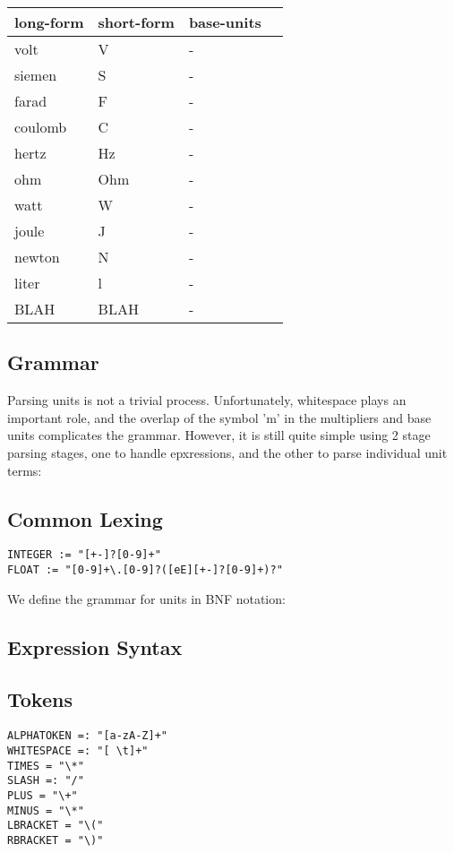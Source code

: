 \documentclass{article}
\begin{document}
\begin{center}
    \begin{tabular}{ | l | l |  l | p{5cm} |}
    \hline
    long-form & short-form & base-units  \\ \hline
    volt & V & - \\ \hline
    siemen & S & - \\ \hline
    farad & F & - \\ \hline
    coulomb & C & - \\ \hline
    hertz & Hz & - \\ \hline
    ohm & Ohm & - \\ \hline
    watt & W & - \\ \hline
    joule & J & - \\ \hline
    newton & N & - \\ \hline
    liter & l & - \\ \hline
    BLAH & BLAH & - \\ \hline
    \end{tabular}
\end{center}


\newpage
\subsection*{Grammar}

Parsing units is not a trivial process. Unfortunately, whitespace plays an important role, and the overlap of the symbol 'm' in the multipliers and base units complicates the grammar. However, it is still quite simple using  2 stage parsing stages, one to handle epxressions, and the other to parse individual unit terms:


\subsection*{Common Lexing}

\begin{verbatim}
INTEGER := "[+-]?[0-9]+"
FLOAT := "[0-9]+\.[0-9]?([eE][+-]?[0-9]+)?"
\end{verbatim}

We define the grammar for units in BNF notation:

\subsection*{Expression Syntax}
\subsection*{Tokens}
\begin{verbatim}
ALPHATOKEN =: "[a-zA-Z]+"
WHITESPACE =: "[ \t]+"
TIMES = "\*"
SLASH =: "/"
PLUS = "\+"
MINUS = "\*"
LBRACKET = "\("
RBRACKET = "\)"
\end{verbatim}
\end{document}
